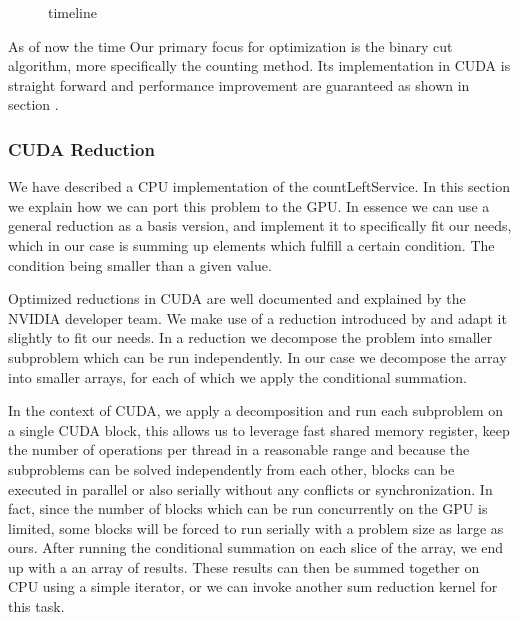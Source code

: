 \documentclass[]{article}
\begin{document}
\begin{figure}
	\begin{center}
	\end{center}
	\caption{timeline}
	\label{u}
\end{figure}

As of now the time
Our primary focus for optimization is the binary cut algorithm, more specifically the counting method. Its implementation in CUDA is straight forward and performance improvement are guaranteed as shown in section . 

\subsubsection{CUDA Reduction}
We have described a CPU implementation of the countLeftService. In this section we explain how we can port this problem to the GPU. In essence we can use a general reduction as a basis version, and implement it to specifically fit our needs, which in our case is summing up elements which fulfill a certain condition. The condition being smaller than a given value.

Optimized reductions in CUDA are well documented and explained by the NVIDIA developer team. We make use of a reduction introduced by  and adapt it slightly to fit our needs. 
In a reduction we decompose the problem into smaller subproblem which can be run independently. In our case we decompose the array into smaller arrays, for each of which we apply the conditional summation. 

In the context of CUDA, we apply a decomposition and run each subproblem on a single CUDA block, this allows us to leverage fast shared memory register, keep the number of operations per thread in a reasonable range and because the subproblems can be solved independently from each other, blocks can be executed in parallel or also serially without any conflicts or synchronization. In fact, since the number of blocks which can be run concurrently on the GPU is limited, some blocks will be forced to run serially with a problem size as large as ours.  After running the conditional summation on each slice of the array, we end up with a an array of results. These results can then be summed together on CPU using a simple iterator, or we can invoke another sum reduction kernel for this task.
\end{document}

